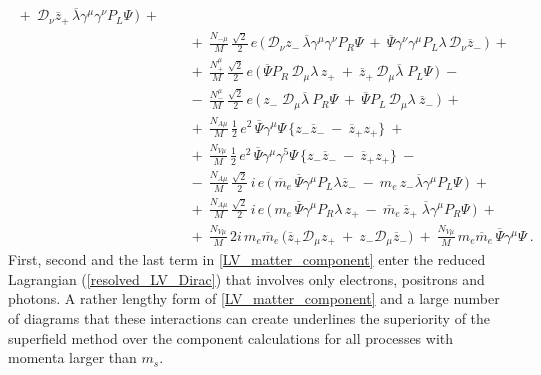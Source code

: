 \documentclass[12pt]{revtex4}
\begin{document}
\begin{eqnarray}
~+~
\mathcal{D}_\nu \overline{z}_+ \,
\overline{\lambda} \gamma^\mu \gamma^\nu
P_L \Psi
\,
\Big)
~+~ \\
\nonumber
&&
~+~
\frac{N_{-\mu}}{M}\,
\frac{\sqrt{2}}{2}\,e\,
\Big(\,
\mathcal{D}_\nu z_- \,
\overline{\lambda}\gamma^\mu\gamma^\nu P_R \Psi
~+~
\overline{\Psi}\gamma^\nu\gamma^\mu P_L \lambda
\, \mathcal{D}_\nu \overline{z}_-
\,
\Big)
~+~ \\
\label{LV_matter_component}
&&
~+~
\frac{N_+^\mu}{M}\,
\frac{\sqrt{2}}{2}\, e\,
\Big(\,
\overline{\Psi}P_R\, \mathcal{D}_\mu \lambda
\, z_+ 
~+~
\overline{z}_+ \,
\mathcal{D}_\mu 
\overline{\lambda}\; P_L \Psi
\,\Big)
~-~ \\
\nonumber
&&
~-~
\frac{N_-^\mu}{M}\,
\frac{\sqrt{2}}{2}\, e\,
\Big(\,
z_-\; \mathcal{D}_\mu \overline{\lambda} ~
P_R \Psi 
~+~
\overline{\Psi} P_L \, \mathcal{D}_\mu \lambda ~
\overline{z}_-
\,\Big) 
~+~ \\
\nonumber
&&
~+~ 
\frac{N_{A\mu}}{M}\,
\frac{1}{2}\, e^2\,
\overline{\Psi}\gamma^\mu  \Psi \,
\Big\{
  z_-  \overline{z}_- 
  ~-~
  \overline{z}_+  z_+
\Big\}
~+~ \\
\nonumber
&&
~+~
\frac{N_{V\mu}}{M}\,
\frac{1}{2}\, e^2\,
\overline{\Psi}\gamma^\mu \gamma^5 \Psi \,
\Big\{
  z_-  \overline{z}_- 
  ~-~
  \overline{z}_+  z_+
\Big\}
~-~ \\
\nonumber
&&
~-~
\frac{N_{A\mu}}{M}\,
\frac{\sqrt{2}}{2}\, i\, e\,
\Big(\,
\overline{m}_e\, \overline{\Psi} \gamma^\mu P_L
\lambda \overline{z}_- 
~-~
m_e\, z_- \overline{\lambda}
\gamma^\mu P_L \Psi
\,\Big)
~+~ \\
\nonumber
&&
~+~
\frac{N_{A\mu}}{M}\,
\frac{\sqrt{2}}{2}\, i\, e\,
\Big(\,
m_e\, \overline{\Psi}\gamma^\mu P_R \lambda\, z_+ 
~-~
\overline{m}_e\, \overline{z}_+\; \overline{\lambda}
\gamma^\mu P_R \Psi
\,\Big)
~+~ \\
\nonumber
&&
~+~ 
\frac{N_{V\mu}}{M}\, 2 i\, m_e \overline{m}_e \,
\big( 
\overline{z}_+ \mathcal{D}_\mu z_+ 
~+~
z_- \mathcal{D}_\mu \overline{z}_-
\big)~+~
\frac{N_{V\mu}}{M}\,
m_e \overline{m}_e \,
\overline{\Psi} \gamma^\mu \Psi
~.
\end{eqnarray}
%
First, second and the last term in \eqref{LV_matter_component}  enter 
the reduced Lagrangian (\ref{resolved_LV_Dirac}) that involves only
electrons, positrons and photons. A rather lengthy form of
\eqref{LV_matter_component} and a large number of diagrams that 
these interactions can create underlines the superiority of the 
superfield method over the component calculations for 
all processes with momenta larger than $m_s$. 
\end{document}
